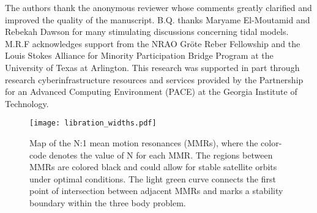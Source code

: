\documentclass[preprint]{aastex63}
\begin{document}



\acknowledgments
{The authors thank the anonymous reviewer whose comments greatly clarified and improved the quality of the manuscript.}  B.Q. thanks Maryame El-Moutamid and Rebekah Dawson for many stimulating discussions concerning tidal models.  M.R.F acknowledges support from the NRAO Gr\"{o}te Reber Fellowship and the Louis Stokes Alliance for Minority Participation Bridge Program at the University of Texas at Arlington.  This research was supported in part through research cyberinfrastructure resources and services provided by the Partnership for an Advanced Computing Environment (PACE) at the Georgia Institute of Technology. 










\begin{figure}
	\texttt{[image: libration\_widths.pdf]}
    \caption{Map of the N:1 mean motion resonances (MMRs), where the color-code denotes the value of N for each MMR.  The regions between MMRs are colored black and could allow for stable satellite orbits under optimal conditions.   The light green curve connects the first point of intersection between adjacent MMRs and marks a stability boundary within the three body problem.}
    \label{fig:moon_MMRs}
\end{figure}
\end{document}
